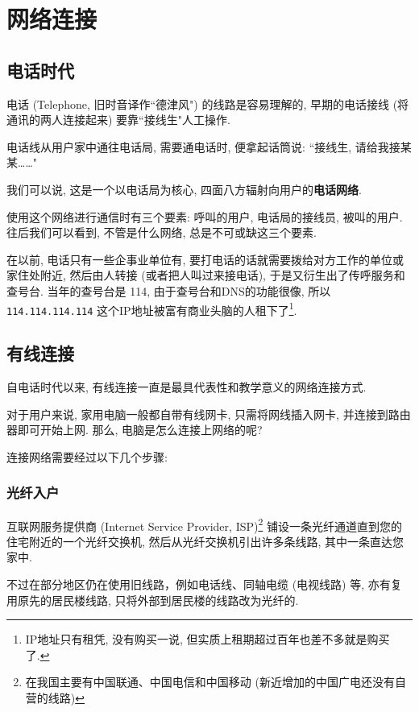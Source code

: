 \chapter{网络连接}

\section{电话时代}

电话 (Telephone, 旧时音译作``德津风") 的线路是容易理解的, 早期的电话接线 (将通讯的两人连接起来) 要靠``接线生"人工操作.

电话线从用户家中通往电话局, 需要通电话时, 便拿起话筒说: ``接线生, 请给我接某某\dots\dots"

我们可以说, 这是一个以电话局为核心, 四面八方辐射向用户的\textbf{电话网络}.

使用这个网络进行通信时有三个要素: 呼叫的用户, 电话局的接线员, 被叫的用户. 往后我们可以看到, 不管是什么网络, 总是不可或缺这三个要素.

在以前, 电话只有一些企事业单位有, 要打电话的话就需要拨给对方工作的单位或家住处附近, 然后由人转接 (或者把人叫过来接电话), 于是又衍生出了传呼服务和查号台. 当年的查号台是 114, 由于查号台和DNS的功能很像, 所以 \verb|114.114.114.114| 这个IP地址被富有商业头脑的人租下了\footnote{IP地址只有租凭, 没有购买一说, 但实质上租期超过百年也差不多就是购买了.}.

\section{有线连接}

自电话时代以来, 有线连接一直是最具代表性和教学意义的网络连接方式.

对于用户来说, 家用电脑一般都自带有线网卡, 只需将网线插入网卡, 并连接到路由器即可开始上网. 那么, 电脑是怎么连接上网络的呢?

连接网络需要经过以下几个步骤:

\subsection{光纤入户}

互联网服务提供商 (Internet Service Provider, ISP)\footnote{在我国主要有中国联通、中国电信和中国移动 (新近增加的中国广电还没有自营的线路)} 铺设一条光纤通道直到您的住宅附近的一个光纤交换机, 然后从光纤交换机引出许多条线路, 其中一条直达您家中.

不过在部分地区仍在使用旧线路，例如电话线、同轴电缆 (电视线路) 等, 亦有复用原先的居民楼线路, 只将外部到居民楼的线路改为光纤的.

